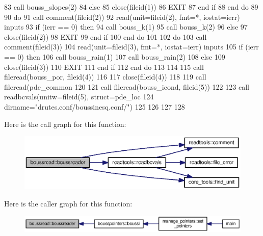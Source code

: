 \begin{DoxyCode}
83           \textcolor{keyword}{call }bouss_slopes(2)%
84         \textcolor{keywordflow}{else}
85           \textcolor{keyword}{close}(fileid(1))
86           \textcolor{keywordflow}{EXIT}
87 \textcolor{keywordflow}{        end if}
88 \textcolor{keywordflow}{      end do}
89       
90        \textcolor{keywordflow}{do} 
91         \textcolor{keyword}{call }comment(fileid(2))
92         \textcolor{keyword}{read}(unit=fileid(2), fmt=*, iostat=ierr) inputs
93         \textcolor{keywordflow}{if} (ierr == 0) \textcolor{keywordflow}{then}
94           \textcolor{keyword}{call }bouss_k(1)%
95           \textcolor{keyword}{call }bouss_k(2)%
96         \textcolor{keywordflow}{else}
97           \textcolor{keyword}{close}(fileid(2))
98           \textcolor{keywordflow}{EXIT}
99 \textcolor{keywordflow}{        end if}
100 \textcolor{keywordflow}{      end do}
101       
102       \textcolor{keywordflow}{do} 
103         \textcolor{keyword}{call }comment(fileid(3))
104         \textcolor{keyword}{read}(unit=fileid(3), fmt=*, iostat=ierr) inputs
105         \textcolor{keywordflow}{if} (ierr == 0) \textcolor{keywordflow}{then}
106           \textcolor{keyword}{call }bouss_rain(1)%
107           \textcolor{keyword}{call }bouss_rain(2)%
108         \textcolor{keywordflow}{else}
109           \textcolor{keyword}{close}(fileid(3))
110           \textcolor{keywordflow}{EXIT}
111 \textcolor{keywordflow}{        end if}
112 \textcolor{keywordflow}{      end do}
113 
114 
115       \textcolor{keyword}{call }fileread(bouss_por, fileid(4))
116       
117       \textcolor{keyword}{close}(fileid(4))
118       
119       \textcolor{keyword}{call }fileread(pde_common%
120       
121       \textcolor{keyword}{call }fileread(bouss_icond, fileid(5))
122       
123       \textcolor{keyword}{call }readbcvals(unitw=fileid(5), struct=pde\_loc%
124 \textcolor{comment}{                      dirname=}\textcolor{stringliteral}{"drutes.conf/boussinesq.conf/"})
125       
126       
127       
128     
\end{DoxyCode}


Here is the call graph for this function\+:\nopagebreak
\begin{figure}[H]
\begin{center}
\leavevmode
\includegraphics[width=350pt]{namespaceboussread_af206b475e8ec2d4ed9f54c22e829a40e_cgraph}
\end{center}
\end{figure}




Here is the caller graph for this function\+:\nopagebreak
\begin{figure}[H]
\begin{center}
\leavevmode
\includegraphics[width=350pt]{namespaceboussread_af206b475e8ec2d4ed9f54c22e829a40e_icgraph}
\end{center}
\end{figure}



